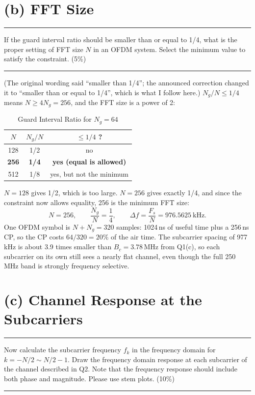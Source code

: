\documentclass[12pt,a4paper]{report}
\newcommand{\question}[1]{%
    \hrule
    \vspace{0.2cm}
    #1
    \vspace{0.2cm}
    \hrule
    \vspace{0.5cm}
}
\begin{document}
\section{(b) FFT Size}

\question{If the guard interval ratio should be smaller than or equal to 1/4, what is the proper setting of FFT size
$N$ in an OFDM system. Select the minimum value to satisfy the constraint. (5\%)}

(The original wording said ``smaller than 1/4''; the announced correction changed it to ``smaller than or equal to 1/4'',
which is what I follow here.) $N_g/N \le 1/4$ means $N \ge 4N_g = 256$, and the FFT size is a power of 2:

\begin{table}[H]
\centering
\caption{Guard Interval Ratio for $N_g = 64$}
\setlength{\tabcolsep}{14pt}
\renewcommand{\arraystretch}{1.2}
\begin{tabular}{ccc}
\toprule
$N$ & $N_g/N$ & $\le 1/4$ ? \\
\midrule
128 & 1/2 & no \\
\textbf{256} & \textbf{1/4} & \textbf{yes (equal is allowed)} \\
512 & 1/8 & yes, but not the minimum \\
\bottomrule
\end{tabular}
\end{table}

$N = 128$ gives 1/2, which is too large. $N = 256$ gives exactly 1/4, and since the constraint now allows equality,
256 is the minimum FFT size:
\begin{equation}
    N = 256, \qquad \frac{N_g}{N} = \frac{1}{4}, \qquad \Delta f = \frac{F_s}{N} = 976.5625\ \text{kHz}.
\end{equation}
One OFDM symbol is $N + N_g = 320$ samples: 1024\,ns of useful time plus a 256\,ns CP, so the CP costs
$64/320 = 20\%$ of the air time. The subcarrier spacing of 977\,kHz is about 3.9 times smaller than $B_c = 3.78$\,MHz
from Q1(c), so each subcarrier on its own still sees a nearly flat channel, even though the full 250\,MHz band is
strongly frequency selective.

\section{(c) Channel Response at the Subcarriers}

\question{Now calculate the subcarrier frequency $f_k$ in the frequency domain for $k = -N/2 \sim N/2 - 1$. Draw the
frequency domain response at each subcarrier of the channel described in Q2. Note that the frequency response should
include both phase and magnitude. Please use stem plots. (10\%)}
\end{document}
